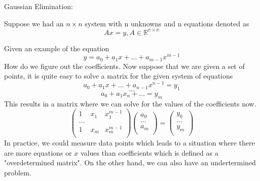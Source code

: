 
\begin{remark}
    Gaussian Elimination:

    Suppose we had an \(n \times n \) system with n unknowns and n equations denoted as 
    \[
        Ax = y, A \in \mathbb{R^{n \times n}}
    \]

    \begin{eg}
        Given an example of the equation 
        \[
             y = a_0 + a_1 x + \dots + a_{m-1} x^{m-1} 
        \]
        How do we figure out the coefficients. Now suppose that we are given a set of points,
        it is quite easy to solve a matrix for the given system of equations 
        \[
            a_0 + a_1 x + \dots  + a_{n-1} x^{n-1}  = y_1 
        \]
        \[
            \dots 
        \]
        \[
            a_0 + a_1 x_n + \dots  = y_m
        \]
        This results in a matrix where we can solve for the values of the coefficients now. 
        \[
            \begin{pmatrix}
                1 &  x_1 &  x_1^{m-1}  \\
                \dots  &  &   \\
                1 &  x_m &   x_m^{m-1} \\
            \end{pmatrix} 
            \begin{pmatrix}
                 a_0 \\
                  \dots   \\
                  a_m \\
            \end{pmatrix}
            = 
            \begin{pmatrix}
                 y_0 \\
                  \dots \\
                  y_m \\
            \end{pmatrix}
        \]
        In practice, we could measure data points which leads to a situation where there are more equations or \(x\) values
        than coefficients which is defined as a "overdetermined matrix". On the other hand, we can also have 
        an undertermined problem. 
    \end{eg}


\end{remark}
